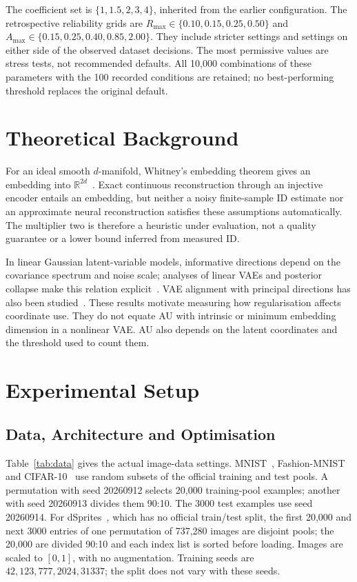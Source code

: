 The coefficient set is $\{1,1.5,2,3,4\}$, inherited from the earlier
configuration. The retrospective reliability grids are
$R_{\max}\in\{0.10,0.15,0.25,0.50\}$ and
$A_{\max}\in\{0.15,0.25,0.40,0.85,2.00\}$.
They include stricter settings and settings on either side of the observed
dataset decisions. The most permissive values are stress tests, not
recommended defaults. All 10,000 combinations of these parameters with
the 100 recorded conditions are retained; no best-performing threshold
replaces the original default.

\section{Theoretical Background}\label{sec:theory}
For an ideal smooth $d$-manifold, Whitney's embedding theorem gives an
embedding into $\mathbb R^{2d}$~\cite{whitney1944}. Exact continuous
reconstruction through an injective encoder entails an embedding, but
neither a noisy finite-sample ID estimate nor an approximate neural
reconstruction satisfies these assumptions automatically. The multiplier
two is therefore a heuristic under evaluation, not a quality guarantee or
a lower bound inferred from measured ID.

In linear Gaussian latent-variable models, informative directions depend
on the covariance spectrum and noise scale; analyses of linear VAEs and
posterior collapse make this relation explicit~\cite{tippingbishop1999ppca,lucas2019elbo}.
VAE alignment with principal directions has also been
studied~\cite{rolinek2019pca}. These results motivate measuring how
regularisation affects coordinate use. They do not equate AU with
intrinsic or minimum embedding dimension in a nonlinear VAE. AU also
depends on the latent coordinates and the threshold used to count them.

\section{Experimental Setup}\label{sec:setup}

\subsection{Data, Architecture and Optimisation}
Table~\ref{tab:data} gives the actual image-data settings.
MNIST~\cite{lecun1998}, Fashion-MNIST~\cite{xiao2017fashion} and
CIFAR-10~\cite{krizhevsky2009learning} use random subsets of the official
training and test pools. A permutation with seed 20260912 selects 20,000
training-pool examples; another with seed 20260913 divides them 90:10.
The 3000 test examples use seed 20260914. For
dSprites~\cite{matthey2017dsprites}, which has no official train/test
split, the first 20,000 and next 3000 entries of one permutation of
737,280 images are disjoint pools; the 20,000 are divided 90:10 and each
index list is sorted before loading. Images are scaled to $[0,1]$, with
no augmentation. Training seeds are $42,123,777,2024,31337$; the split
does not vary with these seeds.

